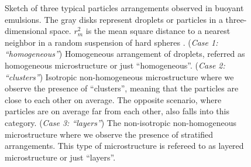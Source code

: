 \begin{figure}[h!]
\begin{tikzpicture}
\end{tikzpicture}
\hfill
\caption{Sketch of three typical particles arrangements observed in buoyant emulsions.
The gray disks represent droplets or particles in a three-dimensional space. 
$r_m^2$ is the mean square distance to a nearest neighbor in a random suspension of hard spheres \citep{zhang2023evolution,fintzi2024buoyancy}.  
(\textit{Case 1: ``homogeneous''}) Homogeneous arrangement of droplets, referred as homogeneous microstructure or just ``homogeneous''.
(\textit{Case 2: ``clusters''}) Isotropic non-homogeneous microstructure where we  observe the presence of ``clusters'', meaning that the particles are close to each other on average.
The opposite scenario, where particles are on average far from each other, also falls into this category. 
(\textit{Case 3: ``layers''}) The non-isotropic non-homogeneous microstructure where we observe the presence of stratified arrangements.
This type of microstructure is refereed to as layered microstructure or just ``layers''. 
}
\label{fig:scheme_clusters}
\end{figure}
